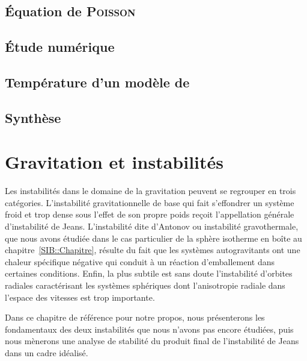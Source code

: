 	\section{Équation de \textsc{Poisson}}
		

	\section{Étude numérique}
		


	\section{Température d'un modèle de \King \label{sec::temp}}
		

	\section{Synthèse}
		


\chapter{Gravitation et instabilités}\label{Chap::Instabilite}
	\minitoc

	Les instabilités dans le domaine de la gravitation peuvent se regrouper en trois catégories. L'instabilité gravitationnelle de base qui fait s'effondrer un
	système froid et trop dense sous l'effet de son propre poids reçoit l'appellation générale d'instabilité de Jeans. L'instabilité dite
	d'Antonov ou instabilité gravothermale, que nous avons étudiée dans le cas particulier de la sphère isotherme en boîte au
	chapitre~\ref{SIB::Chapitre}, résulte du fait que les systèmes autogravitants ont une chaleur spécifique négative qui conduit à un réaction
	d'emballement dans certaines conditions. Enfin, la plus subtile est sans doute l'instabilité d'orbites radiales caractérisant les systèmes
	sphériques dont l'anisotropie radiale dans l'espace des vitesses est trop importante.

	Dans ce chapitre de référence pour notre propos, nous présenterons les fondamentaux des deux instabilités que nous n'avons pas encore étudiées,
	puis nous mènerons une analyse de stabilité du produit final de l'instabilité de Jeans dans un cadre idéalisé.

